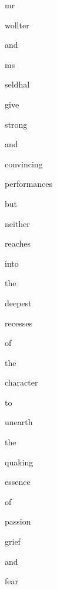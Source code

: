 \documentclass[varwidth]{standalone}
\begin{document}
\begin{CJK*}{UTF8}{gbsn}
{\setlength{\fboxsep}{0pt}\colorbox{white!0}{\parbox{0.8\textwidth}{
\colorbox{red!0.47934538}{\strut mr} \colorbox{red!4.506913}{\strut wollter} \colorbox{red!22.591978}{\strut and} \colorbox{red!1.3662844}{\strut ms} \colorbox{red!2.648377}{\strut seldhal} \colorbox{red!25.234634}{\strut give} \colorbox{red!59.484055}{\strut strong} \colorbox{red!18.91915}{\strut and} \colorbox{red!37.11892}{\strut convincing} \colorbox{blue!4.8403187}{\strut performances} \colorbox{blue!0.60171646}{\strut but} \colorbox{blue!8.0474825}{\strut neither} \colorbox{red!1.3953624}{\strut reaches} \colorbox{blue!1.7878284}{\strut into} \colorbox{blue!1.8901501}{\strut the} \colorbox{red!3.5680861}{\strut deepest} \colorbox{red!2.159412}{\strut recesses} \colorbox{red!2.4432347}{\strut of} \colorbox{red!1.3794377}{\strut the} \colorbox{red!0.74099696}{\strut character} \colorbox{red!5.498272}{\strut to} \colorbox{red!8.712304}{\strut unearth} \colorbox{red!2.9411633}{\strut the} \colorbox{red!1.7249041}{\strut quaking} \colorbox{red!3.120376}{\strut essence} \colorbox{red!4.384714}{\strut of} \colorbox{red!6.2231283}{\strut passion} \colorbox{blue!2.9908366}{\strut grief} \colorbox{red!5.6047273}{\strut and} \colorbox{blue!4.6749907}{\strut fear} 
}}}
\end{CJK*}
\end{document}
